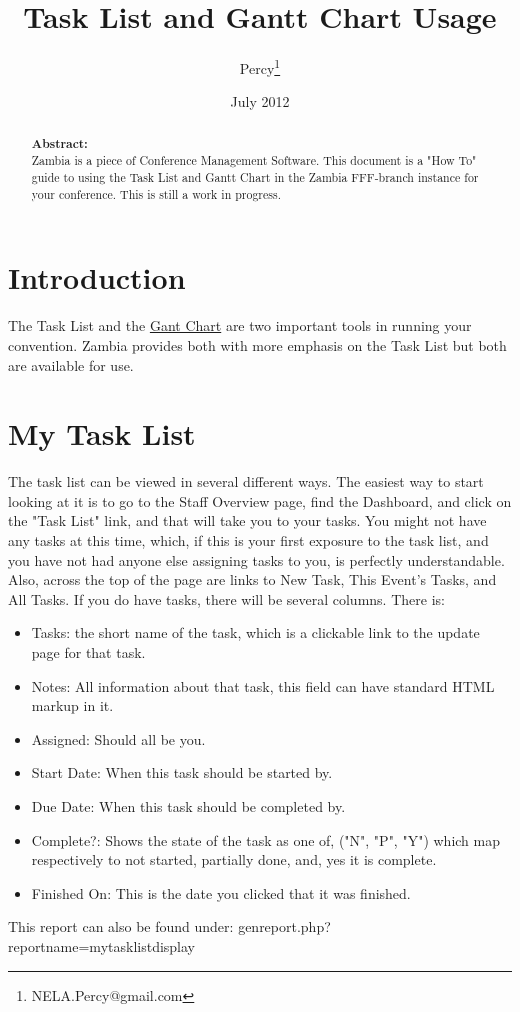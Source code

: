 \documentclass[captions=tablesignature]{scrartcl}
\author{Percy\thanks{NELA.Percy@gmail.com}}
\date{July 2012}
\title{Task List and Gantt Chart Usage}
\begin{document}
\maketitle
{}
\thispagestyle{fancy}
\renewcommand{\headrulewidth}{0pt}
\renewcommand{\footrulewidth}{0pt}
\lhead{}
\rhead{}
\chead{}
\lfoot{}
\cfoot{}
\rfoot{}
\begin{abstract}
\vspace{5cm}
{\LARGE{\textbf{Abstract:\\}}}
Zambia is a piece of Conference Management Software.  This document is a "How To" guide to using the Task List and Gantt Chart in the Zambia FFF-branch instance for your conference.  This is still a work in progress.
\end{abstract}
\newpage
\renewcommand{\headrulewidth}{1pt}
\renewcommand{\footrulewidth}{1pt}
\rfoot{\thepage}
\setcounter{tocdepth}{3}
\tableofcontents
\listoftables
\listoffigures
\newpage
{}
\section{Introduction}
\label{sec-1}
The Task List and the \href{http://en.wikipedia.org/wiki/Gantt_chart}{Gant Chart} are two important tools in running
your convention.  Zambia provides both with more emphasis on the
Task List but both are available for use.

\section{My Task List}
\label{sec-2}
The task list can be viewed in several different ways.  The easiest
way to start looking at it is to go to the Staff Overview page, find
the Dashboard, and click on the "Task List" link, and that will take
you to your tasks.  You might not have any tasks at this time,
which, if this is your first exposure to the task list, and you have
not had anyone else assigning tasks to you, is perfectly
understandable.  Also, across the top of the page are links to New
Task, This Event's Tasks, and All Tasks. If you do have tasks, there
will be several columns.  There is:
\begin{itemize}
\item Tasks: the short name of the task, which is a clickable link to
the update page for that task.
\item Notes: All information about that task, this field can have
standard HTML markup in it.
\item Assigned: Should all be you.
\item Start Date: When this task should be started by.
\item Due Date: When this task should be completed by.
\item Complete?: Shows the state of the task as one of, ("N", "P", "Y")
which map respectively to not started, partially done, and, yes it
is complete.
\item Finished On: This is the date you clicked that it was finished.
\end{itemize}
This report can also be found under:
genreport.php?reportname=mytasklistdisplay
\end{document}
